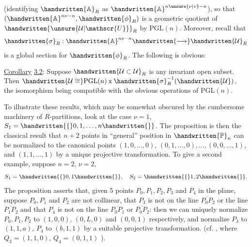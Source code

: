 (identifying $\handwritten{\mathbb{A}}_R$ as $\handwritten{\mathbb{A}}^{n\unsure{\nu|v}-n}$), so that $(\handwritten{\mathbb{A}}^{n\nu-n},\handwritten{\phi}_R)$ is a geometric
quotient of $\handwritten{\unsure{\mathcal{U}|\mathscr{U}}}_R$ by $\mathrm{PGL}(n)$. Moreover, recall that
\[
\handwritten{\sigma}_R:\handwritten{\mathbb{A}}^{n\nu-n}\handwritten{\longrightarrow}\handwritten{\mathcal{U}}_R
\]
is a global section for $\handwritten{\phi}_R$. The following is obvious:

\uline{Corollary} \uline{3.2}: Suppose $\handwritten{\mathcal{U}\subset\mathcal{U}}_R$ is any invariant open subset. Then
$\handwritten{\mathcal{U}\cong}\mathrm{PGL}(n)\mathbin{\mathrm{x}}\handwritten{\sigma}_R^{-1}(\handwritten{\mathcal{U}})$, the isomorphism being compatible with the
obvious operations of $\mathrm{PGL}(n)$.

To illustrate these results, which may be somewhat obscured by the
cumbersome machinery of $R$-partitions, look at the case $\nu=1$, $S_1=\handwritten{\{}0,1,\ldots,n\handwritten{\}}$.
The proposition is then the classical result that $n+2$ points in
``general'' position in $\handwritten{\mathbb{P}}_n$ can be normalized to the canonical points
$(1,0,\ldots,0)$, $(0,1,\ldots,0),\ldots,(0,0,\ldots,1)$, and $(1,1,\ldots,1)$ by a unique
projective transformation. To give a second example, suppose $n=2$,
$\nu=2$,
\[
S_1=\handwritten{\{}0,1\handwritten{\}},\quad S_2=\handwritten{\{}1,2\handwritten{\}}.
\]
The proposition asserts that, given 5 points $P_0,P_1,P_2,P_3$ and $P_4$ in
the plane, suppose $P_0,P_1$ and $P_2$ are not collinear, that $P_3$ is not
on the line $\overline{P_0P_2}$ or the line $\overline{P_1P_2}$ and that $P_4$ is not on the line
$\overline{P_0P_1}$ or $\overline{P_0P_2}$: then we can uniquely normalize $P_0,P_1,P_2$ to $(1,0,0)$,
$(0,L,0)$ and $(0,0,1)$ respectively, and normalize $P_3$ to $(1,1,a)$, $P_4$
to $(b,1,1)$ by a suitable projective transformation. (cf. ,
where $Q_3=(1,1,0)$, $Q_4=(0,1,1)$ ).

